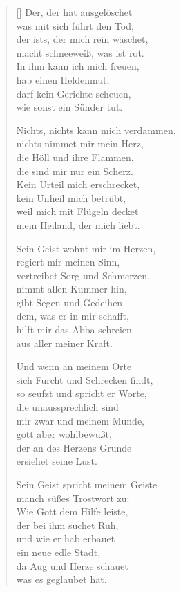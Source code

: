 \begin{multicols}{2}
\begin{verse}[\versewidth]
 Der, der hat ausgelöschet\\
was mit sich führt den Tod,\\
der ists, der mich rein wäschet,\\
macht schneeweiß, was ist rot.\\
In ihm kann ich mich freuen,\\
hab einen Heldenmut,\\
darf kein Gerichte scheuen,\\
wie sonst ein Sünder tut.

 Nichts, nichts kann mich verdammen,\\
nichts nimmet mir mein Herz,\\
die Höll und ihre Flammen,\\
die sind mir nur ein Scherz.\\
Kein Urteil mich erschrecket,\\
kein Unheil mich betrübt,\\
weil mich mit Flügeln decket\\
mein Heiland, der mich liebt.

 Sein Geist wohnt mir im Herzen,\\
regiert mir meinen Sinn,\\
vertreibet Sorg und Schmerzen,\\
nimmt allen Kummer hin,\\
gibt Segen und Gedeihen\\
dem, was er in mir schafft,\\
hilft mir das Abba schreien\\
aus aller meiner Kraft.

\vfill\null
\columnbreak

 Und wenn an meinem Orte\\
sich Furcht und Schrecken findt,\\
so seufzt und spricht er Worte,\\
die unaussprechlich sind\\
mir zwar und meinem Munde,\\
gott aber wohlbewußt,\\
der an des Herzens Grunde\\
ersiehet seine Lust.

 Sein Geist spricht meinem Geiste\\
manch süßes Trostwort zu:\\
Wie Gott dem Hilfe leiste,\\
der bei ihm suchet Ruh,\\
und wie er hab erbauet\\
ein neue edle Stadt,\\
da Aug und Herze schauet\\
was es geglaubet hat.


\end{verse}
\end{multicols}
